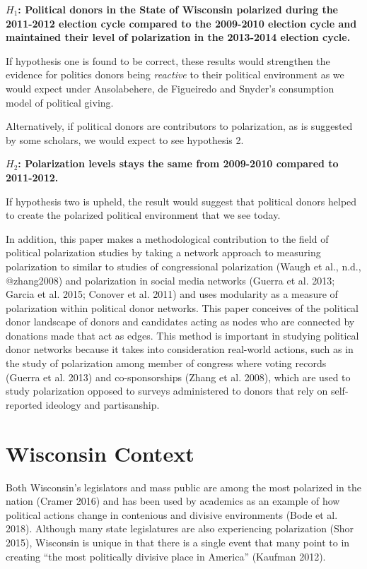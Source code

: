 \documentclass[12pt,]{article}
\begin{document}
\textbf{\(H_{1}\): Political donors in the State of Wisconsin polarized
during the 2011-2012 election cycle compared to the 2009-2010 election
cycle and maintained their level of polarization in the 2013-2014
election cycle.}

If hypothesis one is found to be correct, these results would strengthen
the evidence for politics donors being \emph{reactive} to their
political environment as we would expect under Ansolabehere, de
Figueiredo and Snyder's consumption model of political giving.

Alternatively, if political donors are contributors to polarization, as
is suggested by some scholars, we would expect to see hypothesis 2.

\textbf{\(H_{2}\): Polarization levels stays the same from 2009-2010
compared to 2011-2012.}

If hypothesis two is upheld, the result would suggest that political
donors helped to create the polarized political environment that we see
today.

In addition, this paper makes a methodological contribution to the field
of political polarization studies by taking a network approach to
measuring polarization to similar to studies of congressional
polarization (Waugh et al., n.d., @zhang2008) and polarization in social
media networks (Guerra et al. 2013; Garcia et al. 2015; Conover et al.
2011) and uses modularity as a measure of polarization within political
donor networks. This paper conceives of the political donor landscape of
donors and candidates acting as nodes who are connected by donations
made that act as edges. This method is important in studying political
donor networks because it takes into consideration real-world actions,
such as in the study of polarization among member of congress where
voting records (Guerra et al. 2013) and co-sponsorships (Zhang et al.
2008), which are used to study polarization opposed to surveys
administered to donors that rely on self-reported ideology and
partisanship.

\hypertarget{wisconsin-context}{%
\section{Wisconsin Context}\label{wisconsin-context}}

Both Wisconsin's legislators and mass public are among the most
polarized in the nation (Cramer 2016) and has been used by academics as
an example of how political actions change in contenious and divisive
environments (Bode et al. 2018). Although many state legislatures are
also experiencing polarization (Shor 2015), Wisconsin is unique in that
there is a single event that many point to in creating ``the most
politically divisive place in America'' (Kaufman 2012).
\end{document}
